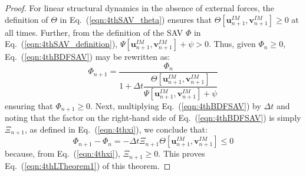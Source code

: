 \documentclass[review]{elsarticle}
\begin{document}
\begin{proof}
  For linear structural dynamics in the absence of external forces, the definition of $\Theta$ in Eq.~(\ref{eqn:4thSAV_theta}) ensures that $\Theta[\boldsymbol{u}_{n+1}^{IM},\boldsymbol{v}_{n+1}^{IM}] \ge 0$ at all times. 
  Further, from the definition of the SAV $\Phi$ in Eq.~(\ref{eqn:4thSAV_definition}), $\Psi[\boldsymbol{u}_{n+1}^{IM},\boldsymbol{v}_{n+1}^{IM}]+\psi > 0$.
  Thus, given $\Phi_n\ge0$, Eq.~(\ref{eqn:4thBDFSAV}) may be rewritten as:
  \begin{equation}
      \Phi_{n+1} = \dfrac{\Phi_n}{ 1+\Delta t\dfrac{\Theta[\boldsymbol{u}_{n+1}^{IM},\boldsymbol{v}_{n+1}^{IM}]}{\Psi[\boldsymbol{u}_{n+1}^{IM},\boldsymbol{v}_{n+1}^{IM}]+\psi} } 
      \label{eqn:4thTimestepping2}
  \end{equation}  
  ensuring that $\Phi_{n+1} \ge 0$.
  Next, multiplying Eq.~(\ref{eqn:4thBDFSAV}) by $\Delta t$ and noting that the factor on the right-hand side of Eq.~(\ref{eqn:4thBDFSAV}) is simply $\Xi_{n+1}$, as defined in Eq.~(\ref{eqn:4thxi}), we conclude that:
  \begin{equation}
      \Phi_{n+1}-\Phi_n = -\Delta t\Xi_{n+1}\Theta[\boldsymbol{u}_{n+1}^{IM},\boldsymbol{v}_{n+1}^{IM}] \le 0
  \end{equation}
  because, from Eq.~(\ref{eqn:4thxi}), $\Xi_{n+1} \ge 0$.
  This proves Eq.~(\ref{eqn:4thLTheorem1}) of this theorem.
  

\end{proof}
\end{document}
